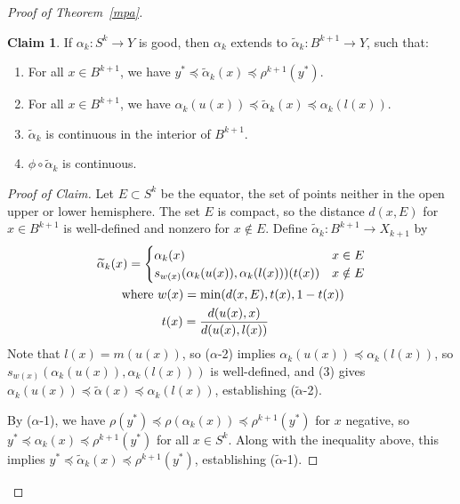 \documentclass[11pt, reqno, english]{amsart}
\theoremstyle{plain}
\theoremstyle{definition}
\newtheorem*{claim}{Claim}
\begin{document}
\begin{proof}[Proof of Theorem~\ref{mpa}]
  \begin{claim}
    If $\alpha_{k}\colon S^{k} \rightarrow Y$ is good, then $\alpha_{k}$
    extends to $\widetilde{\alpha}_{k} \colon B^{k+1} \rightarrow Y$, such
    that:
    \begin{enumerate}
      \item For all $x \in B^{k+1}$, we have $y^{*} \preceq
      \widetilde{\alpha}_{k}(x)
      \preceq \rho^{k+1}(y^{*})$.
      \item For all $x \in B^{k+1}$, we have $\alpha_{k}(u(x)) \preceq
      \widetilde{\alpha}_{k}(x) \preceq \alpha_{k}(l(x))$.
      \item $\widetilde{\alpha}_{k}$ is continuous in the interior of
      $B^{k+1}$.
      \item $\phi \circ \widetilde{\alpha}_{k}$ is continuous.
    \end{enumerate}
  \end{claim}

  \begin{proof}[Proof of Claim]
    Let $E \subset S^{k}$ be the equator, the set of points neither in the open
    upper or lower hemisphere. The set $E$ is compact, so the distance $d(x, E)$ for $x
    \in B^{k+1}$ is well-defined and nonzero for $x \notin E$. Define
    $\widetilde{\alpha}_{k} \colon B^{k+1} \rightarrow X_{k+1}$ by
    \begin{align*}
      &\widetilde{\alpha}_{k}(x) = \begin{cases}
        \alpha_{k}(x) & x \in E\\
        s_{w(x)}(\alpha_{k}(u(x)), \alpha_{k}(l(x)))(t(x)) & x \notin E
      \end{cases}\\
      &\qquad\text{where }w(x) = \min(d(x, E), t(x), 1 - t(x))\\
      &\qquad\hphantom{\text{where }}\,\, t(x) = \frac{d(u(x), x)}{d(u(x),
      l(x))}
    \end{align*}
    Note that $l(x) = m(u(x))$, so ($\alpha$-2) implies $\alpha_{k}(u(x))
    \preceq \alpha_{k}(l(x))$, so $s_{w(x)}(\alpha_{k}(u(x)),
    \alpha_{k}(l(x)))$ is well-defined, and (3) gives $\alpha_{k}(u(x)) \preceq
    \widetilde{\alpha}(x) \preceq \alpha_{k}(l(x))$, establishing
    ($\widetilde{\alpha}$-2).

    By ($\alpha$-1), we have $\rho(y^{*}) \preceq \rho(\alpha_{k}(x)) \preceq
    \rho^{k+1}(y^{*})$ for $x$ negative, so $y^{*} \preceq \alpha_{k}(x)
    \preceq \rho^{k+1}(y^{*})$ for all $x \in S^{k}$. Along with the inequality
    above, this implies $y^{*} \preceq \widetilde{\alpha}_{k}(x) \preceq
    \rho^{k+1}(y^{*})$, establishing ($\widetilde{\alpha}$-1).


\end{proof}
\end{proof}
\end{document}
